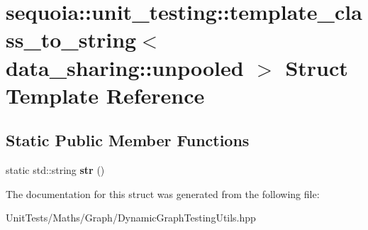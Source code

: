 \hypertarget{structsequoia_1_1unit__testing_1_1template__class__to__string_3_01data__sharing_1_1unpooled_01_4}{}\section{sequoia\+::unit\+\_\+testing\+::template\+\_\+class\+\_\+to\+\_\+string$<$ data\+\_\+sharing\+::unpooled $>$ Struct Template Reference}
\label{structsequoia_1_1unit__testing_1_1template__class__to__string_3_01data__sharing_1_1unpooled_01_4}
\subsection*{Static Public Member Functions}
\begin{DoxyCompactItemize}
\item 
\mbox{\label{structsequoia_1_1unit__testing_1_1template__class__to__string_3_01data__sharing_1_1unpooled_01_4_a064f2a924ea95c145e893f6c4c60119e}} 
static std\+::string {\bfseries str} ()
\end{DoxyCompactItemize}


The documentation for this struct was generated from the following file\+:\begin{DoxyCompactItemize}
\item 
Unit\+Tests/\+Maths/\+Graph/Dynamic\+Graph\+Testing\+Utils.\+hpp\end{DoxyCompactItemize}
